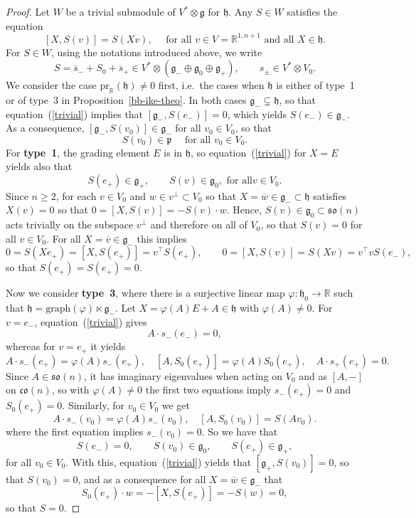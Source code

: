 \documentclass[11pt,a4paper]{amsart}
\newcommand{\vf}{\varphi}
\newcommand{\p}{\mathfrak{p}}
\newcommand{\g}{\mathfrak{g}}
\newcommand{\h}{\mathfrak{h}}
\newcommand{\+}{\oplus}
\newcommand{\so}{\mathfrak{so}}
\newcommand{\co}{\mathfrak{co}}
\newcommand{\1}{\mathbf{1}}
\newcommand{\R}{\mathbb{R}} %
\newcommand{\<}{\langle}
\renewcommand{\>}{\rangle}
\theoremstyle{definition}
\theoremstyle{plain}
\numberwithin{equation}{section}
\begin{document}
\begin{proof}
Let $W$ be a trivial submodule of $V^*\otimes \g$ for $\h$. Any $S\in W$ satisfies the equation
\begin{equation}
\label{trivial}
[X,S(v)] =S(Xv),\quad\text{ for all $v\in V=\R^{1,n+1}$ and all $X\in \h$.}\end{equation}
For $S\in W$, using the notations introduced above, we write
\begin{equation}\label{Ssplit}
S=\overline{s}_- +S_0+\overline{s}_+\in V^*\otimes \left(\g_-\+\g_0\+\g_+\right),\qquad s_\pm\in V^*\otimes V_0.\end{equation}
We consider the case $\mathrm{pr}_\R(\h)\not=0$ first, i.e.~the cases when $\h$ is either of type~1 or of type~3 in Proposition~\ref{bb-ike-theo}. In both cases $\g_-\subsetneq\h$, so that equation~(\ref{trivial}) implies that $[\g_-,S(e_-)]=0$, which yields $S(e_-)\in \g_-$. As a consequence,
$[\g_-,S(v_0)] \in \g_-$ for all $v_0\in V_0$, so that 
\[S(v_0)\in \p\quad\text{  for all $v_0\in V_0$.}\]
For {\bf type~1}, the grading element $E$ is in $\h$, so equation~(\ref{trivial}) for $X=E$ yields also that
\[S(e_+)\in \g_+,\qquad S(v)\in \g_0,\text{ for all} v\in V_0.\]
Since $n\ge 2$, for each $v\in V_0$ and $w\in v^\perp\subset V_0$ so that $X=\overline{w}\in \g_-\subset \h$  satisfies  $X(v)=0$ so that $0=[X,S(v)]=-S(v)\cdot w$. Hence, $S(v)\in \g_0\subset \so(n)$ acts trivially on the subspace $v^\perp$ and therefore on all of $V_0$, so that $S(v)=0$ for all $v\in V_0$. For all $X=\overline{v}\in \g_-$ this  implies 
\[0=S(Xe_+)=[X,S(e_+) ]=v^\top S(e_+), \qquad
0=[X,S(v)]=S(Xv)=v^\top vS(e_-),
\]
so that $S(e_+)=S(e_+)=0$. 

Now we consider {\bf type~3}, where there is a surjective linear map $\vf:\h_0\to \R$ such that $\h=\mathrm{graph}(\vf)\ltimes \g_-$. Let $X=\vf(A)E+A \in \h$ with $\vf(A)\not=0$. For $v=e_-$,  equation~(\ref{trivial}) gives
\[A \cdot s_-(e_-)=0,\]
whereas for 
$v=e_+$
it yields
\[ A\cdot s_-(e_+) =\vf(A) s_-(e_+),\quad  [A,S_0(e_+)]=\vf(A)S_0(e_+),\quad A\cdot s_+(e_+)=0.\]
Since $A\in \so(n)$, it has imaginary eigenvalues when acting on $V_0$ and as $[A,-]$ on $\co(n)$, so with  $\vf(A)\not=0$ the first two equations imply $ s_-(e_+) =0$ and $S_0(e_+)=0$.
Similarly,
for
$v_0\in V_0$ we get
\[ A\cdot s_-(v_0) =\vf(A) s_-(v_0),\quad  [A,S_0(v_0)]=S(Av_0).\]
where the  first equation implies $s_-(v_0)=0$.
So  we have that
\[S(e_-)=0,\qquad S(v_0)\in \g_0,\qquad S(e_+)\in \g_+,\]
for all $v_0\in V_0$.  With this, equation~(\ref{trivial}) yields that
$[\g_+,S(v_0)]=0$, so that $S(v_0)=0$,  and as a consequence  for all $X=\overline{w}\in \g_-$ that
\[S_0(e_+)\cdot w=-[X,S(e_+)]=-S(w)=0,\]
so that $S=0$.


\end{proof}
\end{document}
